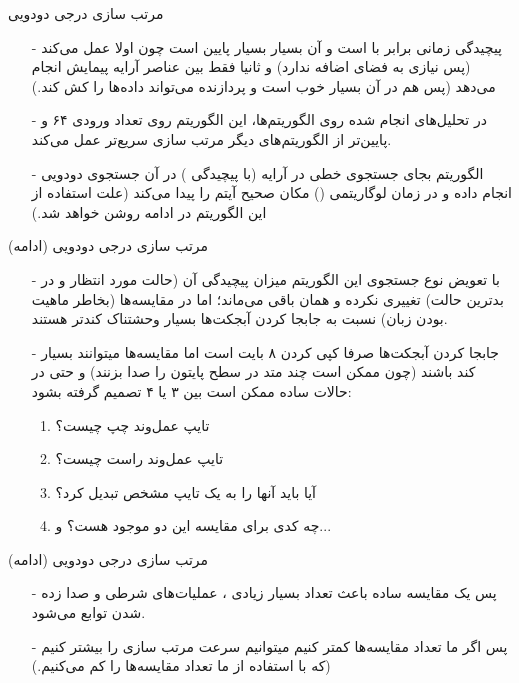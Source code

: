 \begin{frame}{مرتب سازی درجی دودویی}
\begin{itemize}\itemr
\item[-]
پیچیدگی زمانی  برابر با 
است و 
آن بسیار بسیار پایین است چون اولا  عمل می‌کند (پس نیازی به فضای اضافه ندارد) و ثانیا فقط بین عناصر آرایه پیمایش انجام می‌دهد (پس  هم در آن بسیار خوب است و پردازنده می‌تواند داده‌ها را کش کند.)

\item[-]
در تحلیل‌های انجام شده روی الگوریتم‌ها، این الگوریتم روی تعداد ورودی ۶۴ و پایین‌تر از الگوریتم‌های دیگر مرتب سازی سریع‌تر عمل می‌‌کند.

\item[-]
الگوریتم 
بجای جستجوی خطی در آرایه (با پیچیدگی ) در آن جستجوی دودویی انجام داده و در زمان لوگاریتمی () مکان صحیح آیتم را پیدا می‌‌کند (علت استفاده از این الگوریتم در ادامه روشن خواهد شد.)
\end{itemize}
\end{frame}

\begin{frame}{مرتب‌ سازی درجی دودویی (ادامه)}
\begin{itemize}\itemr
\item[-]
با تعویض نوع جستجوی‌ این الگوریتم میزان پیچیدگی آن (حالت مورد انتظار و در بدترین حالت) تغییری نکرده و همان
باقی می‌ماند؛ اما در 
مقایسه‌ها (بخاطر ماهیت  بودن زبان) نسبت به جابجا کردن آبجکت‌ها بسیار وحشتناک کند‌تر هستند.
\item[-]
جابجا کردن آبجکت‌ها صرفا کپی کردن ۸ بایت  است اما مقایسه‌ها میتوانند بسیار کند باشند (چون ممکن است چند متد در سطح پایتون را صدا بزنند) و حتی در حالات ساده ممکن است بین ۳ یا ۴ تصمیم گرفته بشود: 

\begin{enumerate}\itemr
\item 
تایپ عمل‌وند چپ چیست؟
\item 
تایپ عمل‌وند راست چیست؟
\item 
آیا باید آنها را به یک تایپ مشخص تبدیل کرد؟
\item 
چه کدی برای مقایسه این دو موجود هست؟ و...
\end{enumerate}
\end{itemize}
\end{frame}

\begin{frame}{مرتب سازی درجی دودویی (ادامه)}
\begin{itemize}\itemr
\item[-]
پس یک مقایسه ساده باعث تعداد بسیار زیادی ، عملیات‌های شرطی و صدا زده شدن توابع می‌شود.

\item[-]
پس اگر ما تعداد مقایسه‌ها کمتر کنیم میتوانیم سرعت مرتب سازی را بیشتر کنیم (که با استفاده از  ما تعداد مقایسه‌ها را کم می‌کنیم.)
\end{itemize}
\end{frame}

